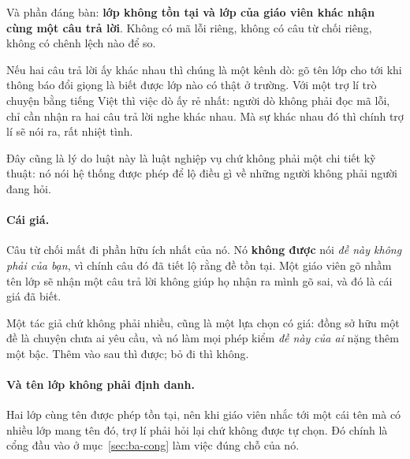 Và phần đáng bàn: \textbf{lớp không tồn tại và lớp của giáo viên khác nhận cùng một câu trả
lời}. Không có mã lỗi riêng, không có câu từ chối riêng, không có chênh lệch nào để so.

Nếu hai câu trả lời ấy khác nhau thì chúng là một kênh dò: gõ tên lớp cho tới khi thông báo đổi
giọng là biết được lớp nào có thật ở trường. Với một trợ lí trò chuyện bằng tiếng Việt thì việc
dò ấy rẻ nhất: người dò không phải đọc mã lỗi, chỉ cần nhận ra hai câu trả lời nghe khác nhau. Mà
sự khác nhau đó thì chính trợ lí sẽ nói ra, rất nhiệt tình.

Đây cũng là lý do luật này là luật nghiệp vụ chứ không phải một chi tiết kỹ thuật: nó nói hệ
thống được phép để lộ điều gì về những người không phải người đang hỏi.

\paragraph{Cái giá.} Câu từ chối mất đi phần hữu ích nhất của nó. Nó \textbf{không được} nói
\emph{đề này không phải của bạn}, vì chính câu đó đã tiết lộ rằng đề tồn tại. Một giáo viên gõ
nhầm tên lớp sẽ nhận một câu trả lời không giúp họ nhận ra mình gõ sai, và đó là cái giá đã biết.

Một tác giả chứ không phải nhiều, cũng là một lựa chọn có giá: đồng sở hữu một đề là chuyện chưa
ai yêu cầu, và nó làm mọi phép kiểm \emph{đề này của ai} nặng thêm một bậc. Thêm vào sau thì
được; bỏ đi thì không.

\paragraph{Và tên lớp không phải định danh.} Hai lớp cùng tên được phép tồn tại, nên khi giáo
viên nhắc tới một cái tên mà có nhiều lớp mang tên đó, trợ lí phải hỏi lại chứ không được tự
chọn. Đó chính là cổng đầu vào ở mục~\ref{sec:ba-cong} làm việc đúng chỗ của nó.
